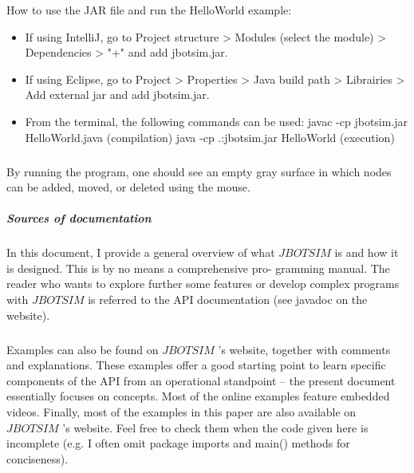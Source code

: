 How to use the JAR file and run the HelloWorld example:
\begin{itemize}
	\item If using IntelliJ, go to Project structure > Modules (select the module) > Dependencies > "+" and add jbotsim.jar.
	\item If using Eclipse, go to Project > Properties > Java build path > Librairies > Add external jar and add jbotsim.jar.
	\item From the terminal, the following commands can be used: javac -cp jbotsim.jar HelloWorld.java (compilation) java -cp .:jbotsim.jar HelloWorld (execution)
\end{itemize}
\subparagraph{}By running the program, one should see an empty gray surface in which nodes can be added, moved, or deleted using the mouse.
\subparagraph{Sources of documentation}In this document, I provide a general overview of what $JBOTSIM$ is and how it is designed. This is by no means a comprehensive pro- gramming manual. The reader who wants to explore further some features or develop complex programs with $JBOTSIM$ is referred to the API documentation (see javadoc on the website). \subparagraph{}Examples can also be found on  $JBOTSIM$ ’s website, together with comments and explanations. These examples offer a good starting point to learn specific components of the API from an operational standpoint – the present document essentially focuses on concepts. Most of the online examples feature embedded videos. Finally, most of the examples in this paper are also available on  $JBOTSIM$ ’s website. Feel free to check them when the code given here is incomplete (e.g. I often omit package imports and main() methods for conciseness).
